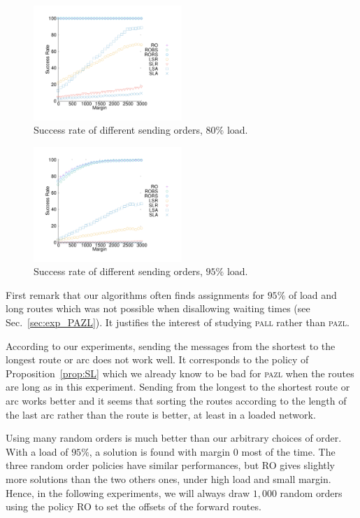 \documentclass[a4paper,10pt]{article}
\newcommand\pazl{\textsc{pazl}\xspace}
\newcommand\pall{\textsc{pall}\xspace}
\begin{document}
\begin{figure}[h] 
  \centering
          \includegraphics[width=0.5\textwidth]{departs_gp_25000.pdf}
      \caption{Success rate of different sending orders, $80\%$ load.}
           \label{fig:success80}
     \end{figure}
     
\begin{figure}[h] 
  \centering
    \includegraphics[width=0.5\textwidth]{departs_gp_21000.pdf}
      \caption{Success rate of different sending orders, $95\%$ load.}
      \label{fig:success95}
          \end{figure}

     First remark that our algorithms often finds assignments for $95\%$ of load and long routes which was not possible 
     when disallowing waiting times (see Sec.~\ref{sec:exp_PAZL}). It justifies the interest of studying \pall rather than \pazl.
          
     According to our experiments, sending the messages from the shortest to the longest route or arc does not work well. It corresponds to the policy of Proposition~\ref{prop:SL} which we already know to be bad for \pazl when the routes are long as in this experiment. Sending from the longest to the shortest route or arc works better and it seems that sorting the routes according to the length of the last arc rather than the route is better, at least in a loaded network. 
     
     Using many random orders is much better than our arbitrary choices of order. With a load of $95\%$, a solution is found with margin $0$ most of the time. The three random order policies have similar performances, but RO gives slightly more solutions than the two others ones, under high load and small margin. Hence, in the following experiments, we will always draw $1,000$ random orders using the policy RO to set the offsets of the forward routes.
     
\end{document}
